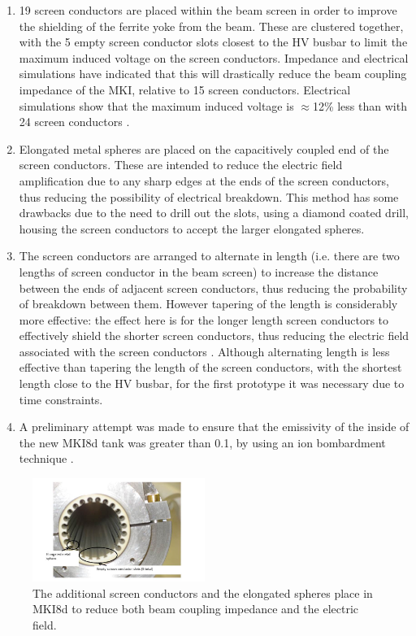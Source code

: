 \begin{enumerate}
\item{19 screen conductors are placed within the beam screen in order to improve the shielding of the ferrite yoke from the beam. These are clustered together, with the 5 empty screen conductor slots closest to the HV busbar to limit the maximum induced voltage on the screen conductors. Impedance and electrical simulations have indicated that this will drastically reduce the beam coupling impedance of the MKI, relative to 15 screen conductors. Electrical simulations show that the maximum induced voltage is $\approx$12\% less than with 24 screen conductors \cite{Barnes:mkiElec}.}
\item{Elongated metal spheres are placed on the capacitively coupled end of the screen conductors. These are intended to reduce the electric field amplification due to any sharp edges at the ends of the screen conductors, thus reducing the possibility of electrical breakdown. This method has some drawbacks due to the need to drill out the slots, using a diamond coated drill, housing the screen conductors to accept the larger elongated spheres.}
\item{The screen conductors are arranged to alternate in length (i.e. there are two lengths of screen conductor in the beam screen) to increase the distance between the ends of adjacent screen conductors, thus reducing the probability of breakdown between them. However tapering of the length is considerably more effective: the effect here is for the longer length screen conductors to effectively shield the shorter screen conductors, thus reducing the electric field associated with the screen conductors \cite{Barnes:improvBeamScreen}. Although alternating length is less effective than tapering the length of the screen conductors, with the shortest length close to the HV busbar, for the first prototype it was necessary due to time constraints.}
\item{A preliminary attempt was made to ensure that the emissivity of the inside of the new MKI8d tank was greater than 0.1, by using an ion bombardment technique \cite{Barnes:mkiElec}.}
\end{enumerate}

\begin{figure}
\begin{center}
\includegraphics[width=0.5\textwidth]{LHC_MKI/figures/mki8d-balls.jpg}
\end{center}
\caption{The additional screen conductors and the elongated spheres place in MKI8d to reduce both beam coupling impedance and the electric field.}
\label{fig:mki8d-points}
\end{figure}

